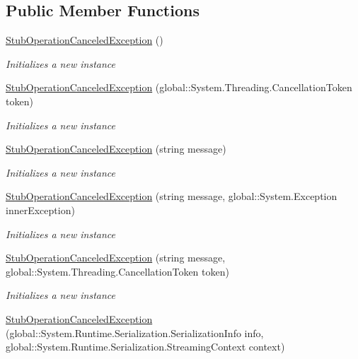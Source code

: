 \subsection*{Public Member Functions}
\begin{DoxyCompactItemize}
\item 
\hyperlink{class_system_1_1_fakes_1_1_stub_operation_canceled_exception_af09d2d38f04d7c97f271cd2c6ee72f5e}{Stub\-Operation\-Canceled\-Exception} ()
\begin{DoxyCompactList}\small\item\em Initializes a new instance\end{DoxyCompactList}\item 
\hyperlink{class_system_1_1_fakes_1_1_stub_operation_canceled_exception_ac5ee28df7c9e074b3f7b221f88b8a570}{Stub\-Operation\-Canceled\-Exception} (global\-::\-System.\-Threading.\-Cancellation\-Token token)
\begin{DoxyCompactList}\small\item\em Initializes a new instance\end{DoxyCompactList}\item 
\hyperlink{class_system_1_1_fakes_1_1_stub_operation_canceled_exception_aaf977d35b28be7a458d7e0e31d746bdb}{Stub\-Operation\-Canceled\-Exception} (string message)
\begin{DoxyCompactList}\small\item\em Initializes a new instance\end{DoxyCompactList}\item 
\hyperlink{class_system_1_1_fakes_1_1_stub_operation_canceled_exception_a3cc4c9c4fbb30fc0ed472e2cc5bb6471}{Stub\-Operation\-Canceled\-Exception} (string message, global\-::\-System.\-Exception inner\-Exception)
\begin{DoxyCompactList}\small\item\em Initializes a new instance\end{DoxyCompactList}\item 
\hyperlink{class_system_1_1_fakes_1_1_stub_operation_canceled_exception_aac5389a3e568ccdfc01bac7b05a2fb29}{Stub\-Operation\-Canceled\-Exception} (string message, global\-::\-System.\-Threading.\-Cancellation\-Token token)
\begin{DoxyCompactList}\small\item\em Initializes a new instance\end{DoxyCompactList}\item 
\hyperlink{class_system_1_1_fakes_1_1_stub_operation_canceled_exception_a762d2b4a5687edf29e1c55a47e3d6eb1}{Stub\-Operation\-Canceled\-Exception} (global\-::\-System.\-Runtime.\-Serialization.\-Serialization\-Info info, global\-::\-System.\-Runtime.\-Serialization.\-Streaming\-Context context)

\end{DoxyCompactItemize}
